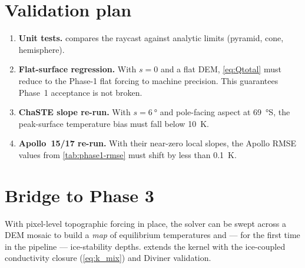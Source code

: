 \section{Validation plan}

\begin{enumerate}
  \item \textbf{Unit tests.}   compares
        the raycast against analytic limits (pyramid, cone, hemisphere).
  \item \textbf{Flat-surface regression.}  With $s=0$ and a flat DEM,
        \cref{eq:Qtotal} must reduce to the Phase-1 flat forcing to
        machine precision.  This guarantees Phase~1 acceptance is not
        broken.
  \item \textbf{ChaSTE slope re-run.}  With $s=\SI{6}{\degree}$ and
        pole-facing aspect at \SI{69}{\degree}S, the peak-surface
        temperature bias must fall below \SI{10}{\kelvin}.
  \item \textbf{Apollo~15/17 re-run.}  With their near-zero local
        slopes, the Apollo RMSE values from \cref{tab:phase1-rmse}
        must shift by less than \SI{0.1}{\kelvin}.
\end{enumerate}

\section{Bridge to Phase 3}

With pixel-level topographic forcing in place, the solver can be swept
across a DEM mosaic to build a \emph{map} of equilibrium temperatures
and --- for the first time in the pipeline --- ice-stability depths.
 extends the kernel with the ice-coupled
conductivity closure (\cref{eq:k_mix}) and Diviner validation.
